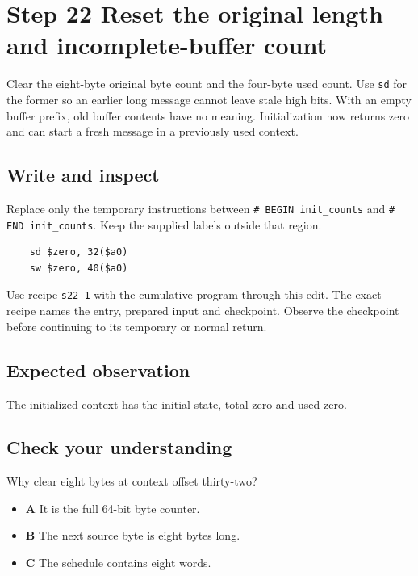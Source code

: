 \section{Step 22 Reset the original length and incomplete-buffer count}\label{sha-s22}

Clear the eight-byte original byte count and the four-byte used count. Use \texttt{sd} for the former so an earlier long message cannot leave stale high bits. With an empty buffer prefix, old buffer contents have no meaning. Initialization now returns zero and can start a fresh message in a previously used context.

\subsection{Write and inspect}
Replace only the temporary instructions between \texttt{\# BEGIN init\_counts} and \texttt{\# END init\_counts}. Keep the supplied labels outside that region.

\begin{verbatim}
    sd $zero, 32($a0)
    sw $zero, 40($a0)
\end{verbatim}

Use recipe \texttt{s22-1} with the cumulative program through this edit. The exact recipe names the entry, prepared input and checkpoint. Observe the checkpoint before continuing to its temporary or normal return.

\subsection{Expected observation}
The initialized context has the initial state, total zero and used zero.

\subsection{Check your understanding}
Why clear eight bytes at context offset thirty-two?

\begin{itemize}
  \item \textbf{A} It is the full 64-bit byte counter.
  \item \textbf{B} The next source byte is eight bytes long.
  \item \textbf{C} The schedule contains eight words.
\end{itemize}
